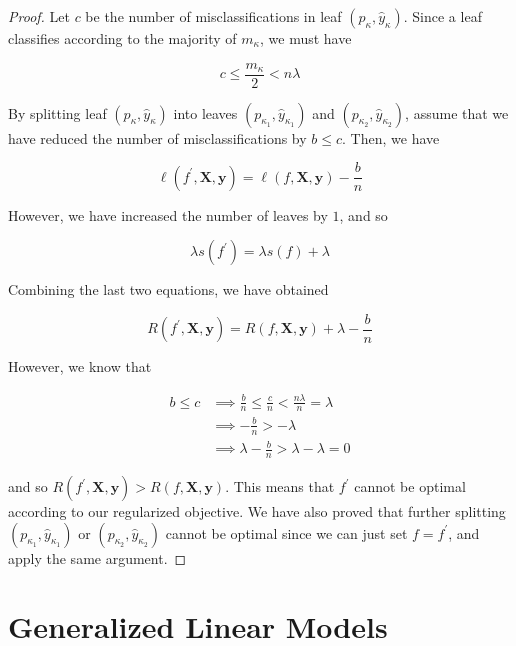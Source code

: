 \documentclass{article}
\begin{document}
      \begin{proof}
      Let $c$ be the number of misclassifications in leaf $(p_{\kappa}, \hat{y}_{\kappa})$. Since a leaf classifies according to the majority of $m_{\kappa}$, we must have 

        \[c \leq \frac{m_\kappa}{2} < n \lambda\]

      By splitting leaf $(p_\kappa, \hat{y}_\kappa)$ into leaves $(p_{\kappa_1}, \hat{y}_{\kappa_1})$ and $(p_{\kappa_2}, \hat{y}_{\kappa_2})$, assume that we have reduced the number of misclassifications by $b \leq c$. Then, we have 

        \[\ell(f^\prime, \mathbf{X}, \mathbf{y}) = \ell(f, \mathbf{X}, \mathbf{y}) - \frac{b}{n}\]

      However, we have increased the number of leaves by $1$, and so 

        \[\lambda s(f^\prime) = \lambda s(f) + \lambda\]

      Combining the last two equations, we have obtained 

        \[R (f^\prime, \mathbf{X}, \mathbf{y}) = R(f, \mathbf{X}, \mathbf{y}) + \lambda - \frac{b}{n}\]

      However, we know that 

      \begin{align*}
        b \leq c & \implies \frac{b}{n} \leq \frac{c}{n} < \frac{n \lambda}{n} = \lambda \\
        & \implies - \frac{b}{n} > - \lambda \\
        & \implies \lambda - \frac{b}{n} > \lambda - \lambda = 0
      \end{align*}

      and so $R (f^\prime, \mathbf{X}, \mathbf{y}) > R(f, \mathbf{X}, \mathbf{y})$. This means that $f^\prime$ cannot be optimal according to our regularized objective. We have also proved that further splitting $(p_{\kappa_1}, \hat{y}_{\kappa_1})$ or $(p_{\kappa_2}, \hat{y}_{\kappa_2})$ cannot  be optimal since we can just set $f = f^\prime$, and apply the same argument. 
      \end{proof}

\section{Generalized Linear Models} 
\end{document}
